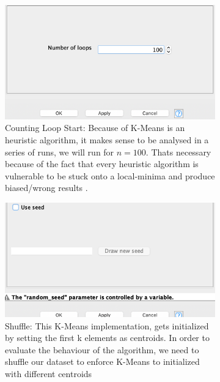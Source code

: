 \documentclass[11pt]{article}
\begin{document}
			\begin{figure}[H]
				\centering
				\begin{subfigure}{0.4\textwidth}
					\includegraphics[width=\textwidth]{res/t1/t15/t15-counting-loop-start-conf}
					\caption{Counting Loop Start: Because of K-Means is an heuristic algorithm, it makes sense to be analysed in a series of runs, we will run for $n=100$. Thats necessary because of the fact that every heuristic algorithm is vulnerable to be stuck onto a local-minima and produce biased/wrong results \cite{???}.}
					\label{fig:first}
				\end{subfigure}
				\hfill
				\begin{subfigure}{0.4\textwidth}
					\includegraphics[width=\textwidth]{res/t1/t15/t15-shuffle-conf}
					\caption{Shuffle: This K-Means implementation, gets initialized by setting the first k elements as centroids. In order to evaluate the behaviour of the algorithm, we need to shuffle our dataset to enforce K-Means to initialized with different centroids \cite{???}}
					\label{fig:second}
				\end{subfigure}
				\hfill
				\begin{subfigure}{0.4\textwidth}

\end{subfigure}
\end{figure}
\end{document}
